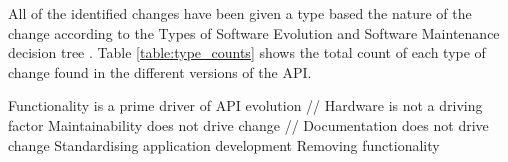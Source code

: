 \documentclass{sig-alternate}
\begin{document}





All of the identified changes have been given a type based the nature of the change according to the Types of Software Evolution and Software Maintenance decision tree \cite{chapin2001types}. Table \ref{table:type_counts} shows the total count of each type of change found in the different versions of the API.

Functionality is a prime driver of API evolution // Hardware is not a driving factor
Maintainability does not drive change // Documentation does not drive change
Standardising application development
Removing functionality

\end{document}
